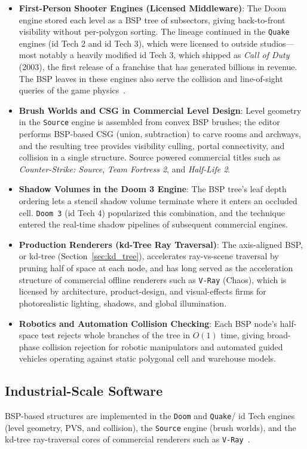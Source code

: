 \begin{itemize}
\item \textbf{First-Person Shooter Engines (Licensed Middleware)}: The
  Doom engine stored each level as a BSP tree of subsectors, giving
  back-to-front visibility without per-polygon sorting. The lineage
  continued in the \texttt{Quake} engines (id Tech 2 and id Tech 3), which
  were licensed to outside studios---most notably a heavily modified id
  Tech 3, which shipped as \emph{Call of Duty} (2003), the first release of
  a franchise that has generated billions in revenue. The BSP leaves in
  these engines also serve the collision and line-of-sight queries of the
  game physics~\cite{naylor1990}.

\item \textbf{Brush Worlds and CSG in Commercial Level Design}: Level
  geometry in the \texttt{Source} engine is assembled from convex BSP
  brushes; the editor performs BSP-based CSG (union, subtraction) to carve
  rooms and archways, and the resulting tree provides visibility culling,
  portal connectivity, and collision in a single structure. Source powered
  commercial titles such as \emph{Counter-Strike: Source}, \emph{Team
  Fortress 2}, and \emph{Half-Life 2}.

\item \textbf{Shadow Volumes in the Doom 3 Engine}: The BSP tree's leaf
  depth ordering lets a stencil shadow volume terminate where it enters an
  occluded cell. \texttt{Doom 3} (id Tech 4) popularized this combination,
  and the technique entered the real-time shadow pipelines of subsequent
  commercial engines.

\item \textbf{Production Renderers (kd-Tree Ray Traversal)}: The axis-aligned
  BSP, or kd-tree (Section~\ref{sec:kd_tree}), accelerates ray-vs-scene
  traversal by pruning half of space at each node, and has long served as
  the acceleration structure of commercial offline renderers such as
  \texttt{V-Ray} (Chaos), which is licensed by architecture,
  product-design, and visual-effects firms for photorealistic lighting,
  shadows, and global illumination.

\item \textbf{Robotics and Automation Collision Checking}: Each BSP node's
  half-space test rejects whole branches of the tree in $O(1)$ time, giving
  broad-phase collision rejection for robotic manipulators and automated
  guided vehicles operating against static polygonal cell and warehouse
  models.
\end{itemize}

\subsection{Industrial-Scale Software}
BSP-based structures are implemented in the \texttt{Doom} and \texttt{Quake}/
id Tech engines (level geometry, PVS, and collision), the \texttt{Source}
engine (brush worlds), and the kd-tree ray-traversal cores of commercial
renderers such as \texttt{V-Ray}~\cite{fuchs1980,naylor1990}.
